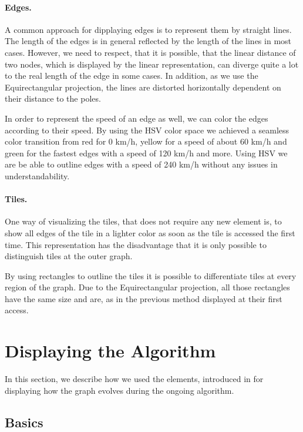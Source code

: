 \documentclass
[
    paper = a4,
    pagesize,
    12 pt,
    oneside,                       %
    open = right,
    DIV = calc,
    BCOR = 0 mm,                   %
    bibtotoc
]
{scrbook}
\begin{document}
\paragraph{Edges.}

A common approach for dipplaying edges is to represent them by straight lines.
The length of the edges is in general reflected by the length of the lines in most cases.
However, we need to respect, that it is possible, that the linear distance of two nodes, which is displayed by the linear representation, can diverge quite a lot to the real length of the edge in some cases.
In addition, as we use the Equirectangular projection, the lines are distorted horizontally dependent on their distance to the poles.

In order to represent the speed of an edge as well, we can color the edges according to their speed.
By using the HSV color space we achieved a seamless color transition from red for 0 km/h, yellow for a speed of about 60 km/h and green for the fastest edges with a speed of 120 km/h and more.
Using HSV we are be able to outline edges with a speed of 240 km/h without any issues in understandability.


\paragraph{Tiles.}
One way of visualizing the tiles, that does not require any new element is, to show all edges of the tile in a lighter color as soon as the tile is accessed the first time.
This representation has the disadvantage that it is only possible to distinguish tiles at the outer graph.

By using rectangles to outline the tiles it is possible to differentiate tiles at every region of the graph.
Due to the Equirectangular projection, all those rectangles have the same size and are, as in the previous method displayed at their first access.


\section{Displaying the Algorithm} \label{algorithm}

In this section, we describe how we used the elements, introduced in  for displaying how the graph evolves during the ongoing algorithm.

\subsection{Basics} \label{basic}
\end{document}
